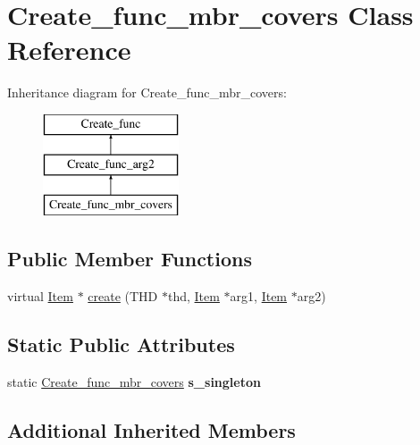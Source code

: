 \hypertarget{classCreate__func__mbr__covers}{}\section{Create\+\_\+func\+\_\+mbr\+\_\+covers Class Reference}
\label{classCreate__func__mbr__covers}
Inheritance diagram for Create\+\_\+func\+\_\+mbr\+\_\+covers\+:\begin{figure}[H]
\begin{center}
\leavevmode
\includegraphics[height=3.000000cm]{classCreate__func__mbr__covers}
\end{center}
\end{figure}
\subsection*{Public Member Functions}
\begin{DoxyCompactItemize}
\item 
virtual \mbox{\hyperlink{classItem}{Item}} $\ast$ \mbox{\hyperlink{classCreate__func__mbr__covers_adc053114bd89549633f1186e41652938}{create}} (T\+HD $\ast$thd, \mbox{\hyperlink{classItem}{Item}} $\ast$arg1, \mbox{\hyperlink{classItem}{Item}} $\ast$arg2)
\end{DoxyCompactItemize}
\subsection*{Static Public Attributes}
\begin{DoxyCompactItemize}
\item 
\mbox{\label{classCreate__func__mbr__covers_a023ba33fd2164d23a6ac31da1c71a35b}} 
static \mbox{\hyperlink{classCreate__func__mbr__covers}{Create\+\_\+func\+\_\+mbr\+\_\+covers}} {\bfseries s\+\_\+singleton}
\end{DoxyCompactItemize}
\subsection*{Additional Inherited Members}


